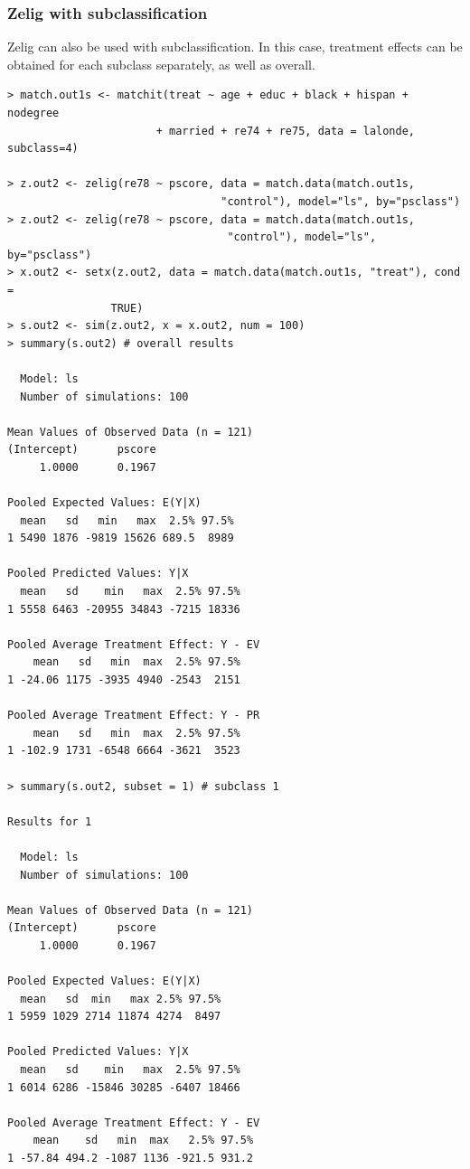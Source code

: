 \documentclass[oneside,letterpaper,titlepage]{article}
\begin{document}
\subsubsection{Zelig with subclassification}
Zelig can also be used with subclassification.  In this case, treatment effects can be obtained for each subclass
separately, as well as overall.

\begin{verbatim}
> match.out1s <- matchit(treat ~ age + educ + black + hispan + nodegree
                       + married + re74 + re75, data = lalonde, subclass=4)

> z.out2 <- zelig(re78 ~ pscore, data = match.data(match.out1s,
                                 "control"), model="ls", by="psclass")
> z.out2 <- zelig(re78 ~ pscore, data = match.data(match.out1s,
                                  "control"), model="ls", by="psclass")
> x.out2 <- setx(z.out2, data = match.data(match.out1s, "treat"), cond =
                TRUE)
> s.out2 <- sim(z.out2, x = x.out2, num = 100)
> summary(s.out2) # overall results

  Model: ls 
  Number of simulations: 100 

Mean Values of Observed Data (n = 121) 
(Intercept)      pscore 
     1.0000      0.1967 

Pooled Expected Values: E(Y|X)
  mean   sd   min   max  2.5% 97.5%
1 5490 1876 -9819 15626 689.5  8989

Pooled Predicted Values: Y|X
  mean   sd    min   max  2.5% 97.5%
1 5558 6463 -20955 34843 -7215 18336

Pooled Average Treatment Effect: Y - EV
    mean   sd   min  max  2.5% 97.5%
1 -24.06 1175 -3935 4940 -2543  2151

Pooled Average Treatment Effect: Y - PR
    mean   sd   min  max  2.5% 97.5%
1 -102.9 1731 -6548 6664 -3621  3523

> summary(s.out2, subset = 1) # subclass 1

Results for 1 

  Model: ls 
  Number of simulations: 100 

Mean Values of Observed Data (n = 121) 
(Intercept)      pscore 
     1.0000      0.1967 

Pooled Expected Values: E(Y|X)
  mean   sd  min   max 2.5% 97.5%
1 5959 1029 2714 11874 4274  8497

Pooled Predicted Values: Y|X
  mean   sd    min   max  2.5% 97.5%
1 6014 6286 -15846 30285 -6407 18466

Pooled Average Treatment Effect: Y - EV
    mean    sd   min  max   2.5% 97.5%
1 -57.84 494.2 -1087 1136 -921.5 931.2


\end{verbatim}
\end{document}
